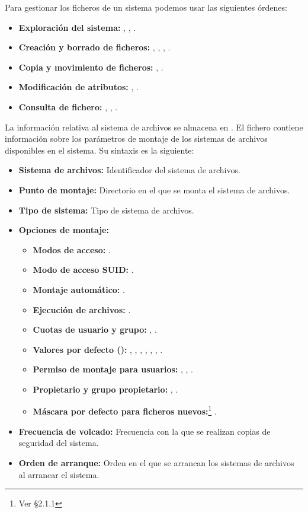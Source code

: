 Para gestionar los ficheros de un sistema podemos usar las siguientes órdenes:

\begin{itemize}
	\item\textbf{Exploración del sistema:} , , .
	\item\textbf{Creación y borrado de ficheros:} , , , .
	\item\textbf{Copia y movimiento de ficheros:} , .
	\item\textbf{Modificación de atributos:} , .
	\item\textbf{Consulta de fichero:} , , .
\end{itemize}

La información relativa al sistema de archivos se almacena en .
El fichero  contiene información sobre los parámetros de montaje de los sistemas de archivos disponibles en el sistema.
Su sintaxis es la siguiente:

\begin{itemize}
\item\textbf{Sistema de archivos:} Identificador del sistema de archivos.
\item\textbf{Punto de montaje:} Directorio en el que se monta el sistema de archivos.
\item\textbf{Tipo de sistema:} Tipo de sistema de archivos.
\item\textbf{Opciones de montaje:}
\begin{itemize}
	\item\textbf{Modos de acceso:} .
	\item\textbf{Modo de acceso SUID:} .
	\item\textbf{Montaje automático:} .
	\item\textbf{Ejecución de archivos:} .
	\item\textbf{Cuotas de usuario y grupo:} , .
	\item\textbf{Valores por defecto ():} , , , , , , .
	\item\textbf{Permiso de montaje para usuarios:} , , .
	\item\textbf{Propietario y grupo propietario:} , .
	\item\textbf{Máscara por defecto para ficheros nuevos:}\footnote{Ver \S2.1.1} .
\end{itemize}
\item\textbf{Frecuencia de volcado:} Frecuencia con la que se realizan copias de seguridad del sistema.
\item\textbf{Orden de arranque:} Orden en el que se arrancan los sistemas de archivos al arrancar el sistema.
\end{itemize}


